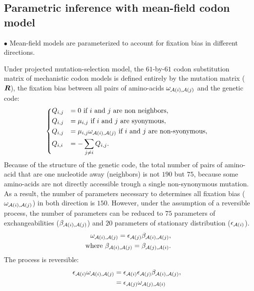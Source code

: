 \subsection{Parametric inference with mean-field codon model}

$\bullet$ Mean-field models are parameterized to account for fixation bias in different directions.

Under projected mutation-selection model, the $61$-by-$61$ \gls{codon} \gls{substitution} matrix of mechanistic \gls{codon} models is defined entirely by the mutation matrix ($\bm{R}$), the fixation bias between all pairs of amino-acids $\omega_{\mathcal{A}({i}), \mathcal{A}({j})}$ and the genetic code:
\begin{equation}
    \begin{dcases}
        Q_{{i}, {j}} & = 0 \text{ if ${i}$ and ${j}$ are non neighbors}, \\
        Q_{{i}, {j}} & = \mu_{{i}, {j}} \text{ if ${i}$ and ${j}$ are syonymous}, \\
        Q_{{i}, {j}} & = \mu_{{i}, {j}} \omega_{\mathcal{A}({i}), \mathcal{A}({j})} \text{ if ${i}$ and ${j}$ are non-syonymous}, \\
        Q_{{i}, {i}} & = - \sum\limits_{{j} \neq {i}} Q_{{i}, {j}}.
    \end{dcases}
    \label{eq:codon-mean-field}
\end{equation}
Because of the structure of the genetic code, the total number of pairs of amino-acid that are one nucleotide away (neighbors) is not $190$ but $75$, because some amino-acids are not directly accessible trough a single non-synonymous mutation.
As a result, the number of parameters necessary to determines all fixation bias ($\omega_{\mathcal{A}({i}), \mathcal{A}({j})}$) in both direction is $150$.
However, under the assumption of a reversible process, the number of parameters can be reduced to $75$ parameters of exchangeabilities ($\beta_{\mathcal{A}({i}), \mathcal{A}({j})}$) and $20$ parameters of stationary distribution ($\epsilon_{\mathcal{A}({i})}$).
\begin{align}
    \omega_{\mathcal{A}({i}), \mathcal{A}({j})} = \epsilon_{\mathcal{A}({j})} \beta_{\mathcal{A}({i}), \mathcal{A}({j})}, \\
    \text{ where } \beta_{\mathcal{A}({i}), \mathcal{A}({j})} = \beta_{\mathcal{A}({j}), \mathcal{A}({i})}.
\end{align}
The process is reversible:
\begin{align}
    \epsilon_{\mathcal{A}({i})} \omega_{\mathcal{A}({i}), \mathcal{A}({j})} & = \epsilon_{\mathcal{A}({i})} \epsilon_{\mathcal{A}({j})} \beta_{\mathcal{A}({i}), \mathcal{A}({j})}, \\
     & = \epsilon_{\mathcal{A}({j})} \omega_{\mathcal{A}({j}), \mathcal{A}({i})}
\end{align}

